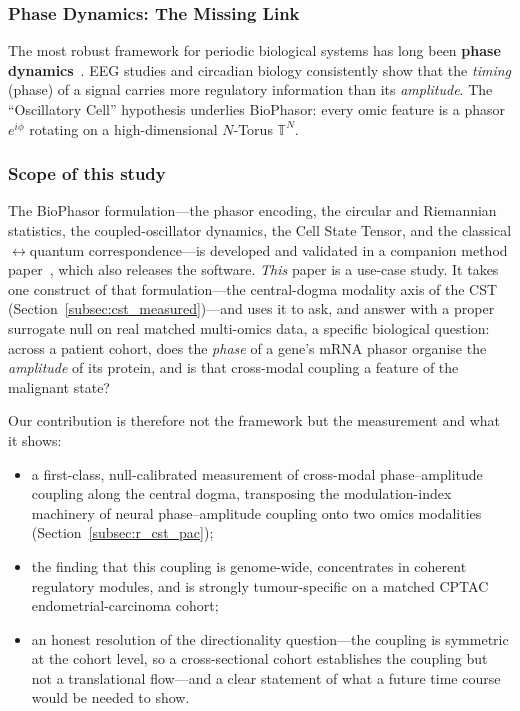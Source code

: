 \documentclass[preprint,12pt,amsmath,amssymb,superscriptaddress,floatfix]{revtex4-2}
\newcommand{\torus}{\mathbb{T}}
\begin{document}
\subsubsection{Phase Dynamics: The Missing Link}

The most robust framework for periodic biological systems has long been
\textbf{phase dynamics}~\cite{ref_021,ref_022,ref_023,ref_027,ref_028,ref_030}.
EEG studies and circadian biology consistently show that the \emph{timing}
(phase) of a signal carries more regulatory information than its
\emph{amplitude}.
The ``Oscillatory Cell'' hypothesis underlies BioPhasor: every omic feature
is a phasor $e^{i\phi}$ rotating on a high-dimensional $N$-Torus $\torus^N$.

\subsubsection{Scope of this study}

The BioPhasor formulation---the phasor encoding, the circular and Riemannian
statistics, the coupled-oscillator dynamics, the Cell State Tensor, and the
classical$\leftrightarrow$quantum correspondence---is developed and validated in a
companion method paper~\cite{biophasor_platform}, which also releases the software.
\emph{This} paper is a use-case study. It takes one construct of that
formulation---the central-dogma modality axis of the CST
(Section~\ref{subsec:cst_measured})---and uses it to ask, and answer with a proper
surrogate null on real matched multi-omics data, a specific biological question:
across a patient cohort, does the \emph{phase} of a gene's mRNA phasor organise the
\emph{amplitude} of its protein, and is that cross-modal coupling a feature of the
malignant state?

Our contribution is therefore not the framework but the measurement and what it
shows:
\begin{itemize}
  \item a first-class, null-calibrated measurement of cross-modal
  phase--amplitude coupling along the central dogma, transposing the
  modulation-index machinery of neural phase--amplitude coupling onto two omics
  modalities (Section~\ref{subsec:r_cst_pac});
  \item the finding that this coupling is genome-wide, concentrates in coherent
  regulatory modules, and is strongly tumour-specific on a matched CPTAC
  endometrial-carcinoma cohort;
  \item an honest resolution of the directionality question---the coupling is
  symmetric at the cohort level, so a cross-sectional cohort establishes the
  coupling but not a translational flow---and a clear statement of what a future
  time course would be needed to show.
\end{itemize}
\end{document}
